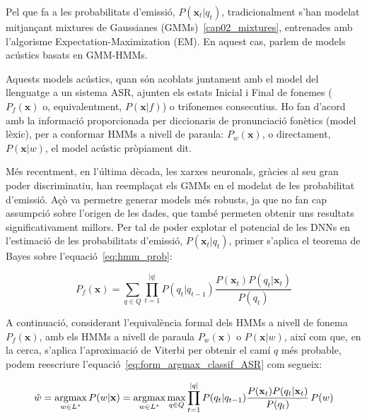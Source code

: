 Pel que fa a les probabilitats d'emissió, $P(\textbf{x}_t|q_t)$, tradicionalment s'han modelat mitjançant mixtures de Gaussianes (GMMs)~\ref{cap02_mixtures}, entrenades amb l'algorisme Expectation-Maximization (EM). En aquest cas, parlem de models acústics basats en GMM-HMMs.

Aquests models acústics, quan són acoblats juntament amb el model del llenguatge a un sistema ASR, ajunten els estats Inicial i Final de fonemes ($P_f(\textbf{x})$ o, equivalentment, $P(\textbf{x}|f)$) o trifonemes consecutius. Ho fan d'acord amb la informació proporcionada per diccionaris de pronunciació fonètics (model lèxic), per a conformar HMMs a nivell de paraula: $P_w(\textbf{x})$, o directament, $P(\textbf{x}|w)$, el model acústic pròpiament dit. 

Més recentment, en l'última dècada, les xarxes neuronals, gràcies al seu gran poder discriminatiu, han reemplaçat els GMMs en el modelat de les probabilitat d'emissió. 
Açò va permetre generar models més robusts, ja que no fan cap assumpció sobre l'origen de les dades, que també permeten obtenir uns resultats significativament millors\cite{hinton2012}. 
Per tal de poder explotar el potencial de les DNNs en l'estimació de les probabilitats d'emissió, $P(\textbf{x}_t|q_t)$, primer s'aplica el teorema de Bayes sobre l'equació~\ref{eq:hmm_prob}:

\begin{equation}
P_f(\textbf{x}) = \sum_{q \in Q} \prod_{t=1}^{|q|} P(q_t|q_{t-1}) \frac{P(\textbf{x}_t) P(q_t|\textbf{x}_t)}{P(q_t)} 
\end{equation}

A continuació, considerant l'equivalència formal dels HMMs a nivell de fonema $P_f(\textbf{x})$, amb els HMMs a nivell de paraula $P_w(\textbf{x})$ o $P(\textbf{x}|w)$, així com que, en la cerca, s'aplica l'aproximació de Viterbi per obtenir el camí $q$ més probable, podem reescriure l'equació~\ref{eq:form_argmax_classif_ASR} com segueix:

\begin{equation}
	\hat{w} = \operatorname*{argmax}_{w \in L^{*}} P(w | \textbf{x}) = \operatorname*{argmax}_{w \in L^{*}} \max_{q \in Q} \prod_{t=1}^{|q|} P(q_t|q_{t-1}) \frac{P(\textbf{x}_t) P(q_t|\textbf{x}_t)}{P(q_t)} \, P(w)
    \label{eq:cerca_nivell_paraules}
\end{equation}

